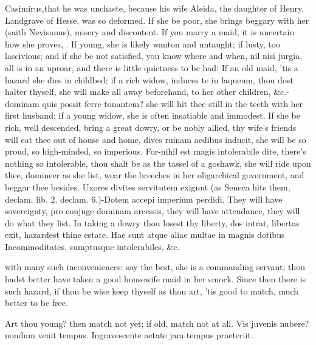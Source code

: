 {Casimirus,that he was unchaste, because his wife Aleida, the
daughter of Henry, Landgrave of Hesse, was so deformed. If she be poor,
she brings beggary with her (saith Nevisanus), misery and discontent.
If you marry a maid, it is uncertain how she proves, . If young, she is likely wanton and untaught;
if lusty, too lascivious; and if she be not satisfied, you know where
and when, nil nisi jurgia, all is in an uproar, and there is little
quietness to be had; If an old maid, 'tis a hazard she dies in
childbed; if a rich widow, induces te in laqueum, thou dost
halter thyself, she will make all away beforehand, to her other
children, \&c.-dominam quis possit ferre tonantem? she will hit
thee still in the teeth with her first husband; if a young widow, she
is often insatiable and immodest. If she be rich, well descended, bring
a great dowry, or be nobly allied, thy wife's friends will eat thee out
of house and home, dives ruinam aedibus inducit, she will be so proud,
so high-minded, so imperious. For-nihil est magis intolerabile dite,
there's nothing so intolerable, thou shalt be as the tassel of a
goshawk, she will ride upon thee, domineer as she list, wear the
breeches in her oligarchical government, and beggar thee besides.
Uxores divites servitutem exigunt (as Seneca hits them, declam. lib. 2.
declam. 6.)-Dotem accepi imperium perdidi. They will have sovereignty,
pro conjuge dominam arcessis, they will have attendance, they will do
what they list. In taking a dowry thou losest thy liberty, dos
intrat, libertas exit, hazardest thine estate.
Hae sunt atque aliae multae in magnis dotibus
Incommoditates, sumptusque intolerabiles, \&c.

with many such inconveniences: say the best, she is a commanding
servant; thou hadst better have taken a good housewife maid in her
smock. Since then there is such hazard, if thou be wise keep thyself as
thou art, 'tis good to match, much better to be free.

Art thou young? then match not yet; if old, match not at all.
Vis juvenis nubere? nondum venit tempus.
Ingravescente aetate jam tempus praeteriit.

}
